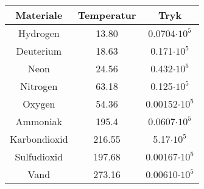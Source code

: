 \begin{tabular}{|c|c|c|}
	\hline
	Materiale&Temperatur&Tryk\\
	\hline
	Hydrogen&13.80&0.0704$\cdot 10^5$\\
	Deuterium&18.63&0.171$\cdot 10^5$\\
	Neon&24.56&0.432$\cdot 10^5$\\
	Nitrogen&63.18&0.125$\cdot 10^5$\\
	Oxygen&54.36&0.00152$\cdot 10^5$\\
	Ammoniak&195.4&0.0607$\cdot 10^5$\\
	Karbondioxid&216.55&5.17$\cdot 10^5$\\
	Sulfudioxid&197.68&0.00167$\cdot 10^5$\\
	Vand&273.16&0.00610$\cdot 10^5$\\
	\hline
\end{tabular}